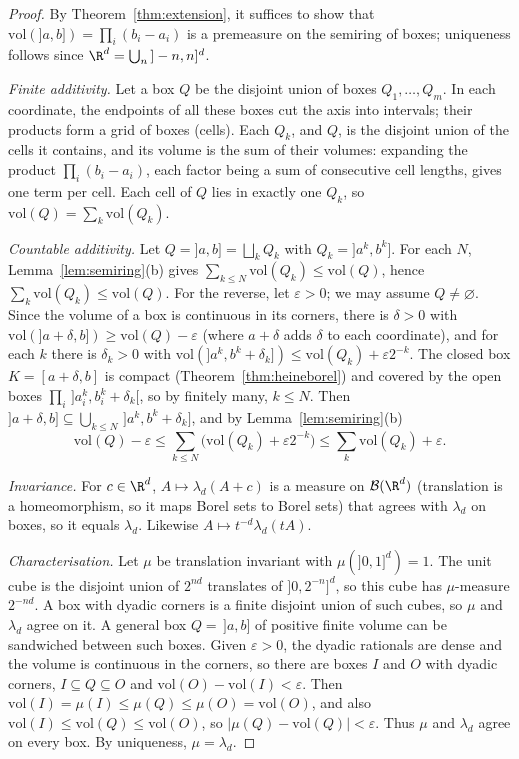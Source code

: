 \begin{proof}
By Theorem~\ref{thm:extension}, it suffices to show that $\mathrm{vol}(]a,b])=\prod_i(b_i-a_i)$ is a premeasure on the semiring of boxes; uniqueness follows since $\R^d=\bigcup_n\,]-n,n]^d$.

\emph{Finite additivity.} Let a box $Q$ be the disjoint union of boxes $Q_1,\dots,Q_m$. In each coordinate, the endpoints of all these boxes cut the axis into intervals;
their products form a grid of boxes (cells). Each $Q_k$, and $Q$, is the disjoint union of the cells it contains, and its volume is the sum of their volumes:
expanding the product $\prod_i(b_i-a_i)$, each factor being a sum of consecutive cell lengths, gives one term per cell. Each cell of $Q$ lies in exactly one $Q_k$,
so $\mathrm{vol}(Q)=\sum_k\mathrm{vol}(Q_k)$.

\emph{Countable additivity.} Let $Q=]a,b]=\bigsqcup_kQ_k$ with $Q_k=]a^k,b^k]$. For each $N$, Lemma~\ref{lem:semiring}(b) gives $\sum_{k\le N}\mathrm{vol}(Q_k)\le\mathrm{vol}(Q)$, hence $\sum_k\mathrm{vol}(Q_k)\le\mathrm{vol}(Q)$. For the
reverse, let $\varepsilon>0$; we may assume $Q\ne\varnothing$. Since the volume of a box is continuous in its corners, there is $\delta>0$ with $\mathrm{vol}(]a+\delta,b])\ge\mathrm{vol}(Q)-\varepsilon$ (where
$a+\delta$ adds $\delta$ to each coordinate), and for each $k$ there is $\delta_k>0$ with $\mathrm{vol}(]a^k,b^k+\delta_k])\le\mathrm{vol}(Q_k)+\varepsilon2^{-k}$. The closed box $K=[a+\delta,b]$ is compact
(Theorem~\ref{thm:heineborel}) and covered by the open boxes $\prod_i\,]a^k_i,b^k_i+\delta_k[$, so by finitely many, $k\le N$. Then $]a+\delta,b]\subseteq\bigcup_{k\le N}\,]a^k,b^k+\delta_k]$, and by Lemma~\ref{lem:semiring}(b)
\[\mathrm{vol}(Q)-\varepsilon\le\sum_{k\le N}\bigl(\mathrm{vol}(Q_k)+\varepsilon2^{-k}\bigr)\le\sum_k\mathrm{vol}(Q_k)+\varepsilon.\]

\emph{Invariance.} For $c\in\R^d$, $A\mapsto\lambda_d(A+c)$ is a measure on $\mathcal B(\R^d)$ (translation is a homeomorphism, so it maps Borel sets to Borel sets) that agrees with
$\lambda_d$ on boxes, so it equals $\lambda_d$. Likewise $A\mapsto t^{-d}\lambda_d(tA)$.

\emph{Characterisation.} Let $\mu$ be translation invariant with $\mu(]0,1]^d)=1$. The unit cube is the disjoint union of $2^{nd}$ translates of $]0,2^{-n}]^d$, so this cube has
$\mu$-measure $2^{-nd}$. A box with dyadic corners is a finite disjoint union of such cubes, so $\mu$ and $\lambda_d$ agree on it. A general box $Q=\,]a,b]$ of positive finite volume can be sandwiched between such boxes. Given $\varepsilon>0$, the dyadic rationals are dense and the volume is continuous in the corners, so there are boxes $I$ and $O$ with dyadic corners, $I\subseteq Q\subseteq O$ and $\mathrm{vol}(O)-\mathrm{vol}(I)<\varepsilon$. Then $\mathrm{vol}(I)=\mu(I)\le\mu(Q)\le\mu(O)=\mathrm{vol}(O)$, and also $\mathrm{vol}(I)\le\mathrm{vol}(Q)\le\mathrm{vol}(O)$, so $|\mu(Q)-\mathrm{vol}(Q)|<\varepsilon$. Thus $\mu$ and $\lambda_d$ agree on every box. By uniqueness, $\mu=\lambda_d$.
\end{proof}

